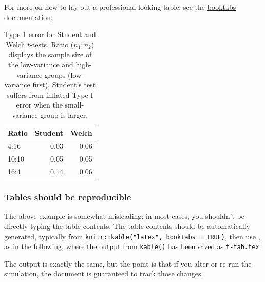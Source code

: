 \documentclass{article}
\begin{document}
For more on how to lay out a professional-looking table, see the \href{https://mirrors.ibiblio.org/pub/mirrors/CTAN/macros/latex/contrib/booktabs/booktabs.pdf}{booktabs documentation}.

\begin{LTXexample}
\begin{table}
\centering
\caption{Type 1 error for Student and Welch
$t$-tests. Ratio ($n_1:n_2$) displays the sample
size of the low-variance and high-variance
groups (low-variance first). Student's test
suffers from inflated Type I error when the
small-variance group is larger.}
\label{tab:error-rate}

\begin{tabular}{lrr}
\toprule
Ratio & Student & Welch\\
\midrule
4:16 & 0.03 & 0.06\\
10:10 & 0.05 & 0.05\\
16:4 & 0.14 & 0.06\\
\bottomrule
\end{tabular}

\end{table}
\end{LTXexample}

\subsubsection*{Tables should be reproducible}

The above example is somewhat misleading: in most cases, you shouldn't be directly typing the table contents. The table contents should be automatically generated, typically from \verb|knitr::kable("latex", booktabs = TRUE)|, then use \verb||, as in the following, where the output from \verb|kable()| has been saved as \verb|t-tab.tex|:

\begin{LTXexample}
\begin{table}
\centering
\caption{Type 1 error for Student and Welch
$t$-tests. Ratio ($n_1:n_2$) displays the sample
size of the low-variance and high-variance
groups (low-variance first). Student's test
suffers from inflated Type I error when the
small-variance group is larger.}
\label{tab:same-error-rate}

\end{table}
\end{LTXexample}

The output is exactly the same, but the point is that if you alter or re-run the simulation, the document is guaranteed to track those changes.

\newpage



\end{document}

